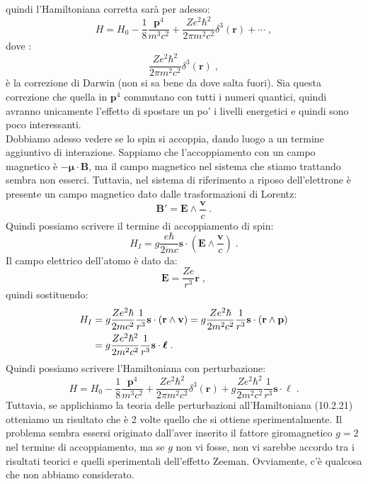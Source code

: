 \documentclass[10pt,a4paper]{report}
\theoremstyle{definition}
\numberwithin{equation}{section}
\begin{document}
quindi l'Hamiltoniana corretta sarà per adesso:
\begin{equation}
H=H_0-\frac{1}{8}\frac{\mathbf{p}^4}{m^3c^2}+\frac{Ze^2\hbar^2}{2\pi m^2c^2}\delta^3(\mathbf{r})+\cdots\;,
\end{equation}
dove :
\begin{equation}
\frac{Ze^2\hbar^2}{2\pi m^2c^2}\delta^3(\mathbf{r})\;,
\end{equation}
è la correzione di Darwin (non si sa bene da dove salta fuori). Sia questa correzione che quella in $\mathbf{p}^4$ commutano con tutti i numeri quantici, quindi avranno unicamente l'effetto di spostare un po' i livelli energetici e quindi sono poco interessanti.\\
Dobbiamo adesso vedere se lo spin si accoppia, dando luogo a un termine aggiuntivo di interazione. Sappiamo che l'accoppiamento con un campo magnetico è $-\boldsymbol{\mu}\cdot\mathbf{B}$, ma il campo magnetico nel sistema che stiamo trattando sembra non esserci. Tuttavia, nel sistema di riferimento a riposo dell'elettrone è presente un campo magnetico dato dalle trasformazioni di Lorentz:
\begin{equation}
\mathbf{B}'=\mathbf{E}\wedge \frac{\mathbf{v}}{c}\;.
\end{equation}
Quindi possiamo scrivere il termine di accoppiamento di spin:
\begin{equation}
H_I=g\frac{e\hbar}{2mc}\mathbf{s}\cdot\left(\mathbf{E}\wedge \frac{\mathbf{v}}{c}\right)\;.
\end{equation}
Il campo elettrico dell'atomo è dato da:
\begin{equation}
\mathbf{E}=\frac{Ze}{r^3}\mathbf{r}\;,
\end{equation}
quindi sostituendo:
\begin{align}
H_I &=g\frac{Ze^2\hbar}{2mc^2}\frac{1}{r^3}\mathbf{s}\cdot(\mathbf{r}\wedge\mathbf{v})=g\frac{Ze^2\hbar}{2m^2c^2}\frac{1}{r^3}\mathbf{s}\cdot(\mathbf{r}\wedge\mathbf{p}) \notag \\
&=g\frac{Ze^2\hbar^2}{2m^2c^2}\frac{1}{r^3}\mathbf{s}\cdot\boldsymbol{\ell}\;.
\end{align}
Quindi possiamo scrivere l'Hamiltoniana con perturbazione:
\begin{equation}
H=H_0-\frac{1}{8}\frac{\mathbf{p}^4}{m^3c^2}+\frac{Ze^2\hbar^2}{2\pi m^2c^2}\delta^3(\mathbf{r})+g\frac{Ze^2\hbar^2}{2m^2c^2}\frac{1}{r^3}\mathbf{s}\cdot\boldsymbol{\ell}\;.
\end{equation}
Tuttavia, se applichiamo la teoria delle perturbazioni all'Hamiltoniana (10.2.21) otteniamo un risultato che è 2 volte quello che si ottiene sperimentalmente. Il problema sembra essersi originato dall'aver inserito il fattore giromagnetico $g=2$ nel termine di accoppiamento, ma se $g$ non vi fosse, non vi sarebbe accordo tra i risultati teorici e quelli sperimentali dell'effetto Zeeman. Ovviamente, c'è qualcosa che non abbiamo considerato. \\
\end{document}
